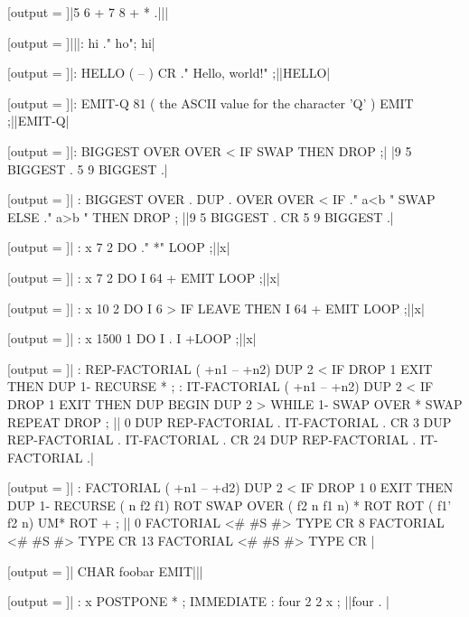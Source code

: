 \RequirePackage{runner}
\newcommand{\result}{}
\makeatletter

[output = \result]|5 6 + 7 8 + * .|||
\typeout{\result}

[output = \result]|||: hi ." ho"; hi|
\typeout{\result}

[output = \result]|: HELLO  ( -- )  CR ." Hello, world!" ;||HELLO|
\typeout{\result}

[output = \result]|: EMIT-Q   81 ( the ASCII value for the character 'Q' ) EMIT ;||EMIT-Q|
\typeout{\result}

[output = \result]|: BIGGEST OVER OVER < IF SWAP THEN DROP ;|%
|9 5 BIGGEST . 5 9 BIGGEST .|
\typeout{\result}

[output = \result]|
  : BIGGEST OVER . DUP .
    OVER OVER < IF
      ." a<b " SWAP
    ELSE
      ." a>b "
    THEN
    DROP ;
||9 5 BIGGEST . CR 5 9 BIGGEST .|
\typeout{\result}

[output = \result]|
  : x 7 2 DO ." *" LOOP ;||x|
\typeout{\result}

[output = \result]|
  : x 7 2 DO I 64 + EMIT LOOP ;||x|
\typeout{\result}

[output = \result]|
  : x 10 2 DO I 6 > IF LEAVE THEN I 64 + EMIT LOOP ;||x|
\typeout{\result}

[output = \result]|
  : x 1500 1 DO I . I +LOOP ;||x|
\typeout{\result}

[output = \result]|
  : REP-FACTORIAL ( +n1 -- +n2)
  DUP 2 < IF DROP 1 EXIT THEN
  DUP 1- RECURSE *
  ;
  : IT-FACTORIAL ( +n1 -- +n2)
  DUP 2 < IF DROP 1 EXIT THEN
  DUP
  BEGIN DUP 2 > WHILE
  1- SWAP OVER * SWAP
  REPEAT DROP
  ;
||
0 DUP REP-FACTORIAL . IT-FACTORIAL . CR
3 DUP REP-FACTORIAL . IT-FACTORIAL . CR
24 DUP REP-FACTORIAL . IT-FACTORIAL .|
\typeout{\result}

[output = \result]|
  : FACTORIAL ( +n1 -- +d2)
  DUP 2 < IF DROP 1 0 EXIT THEN
  DUP 1- RECURSE ( n f2 f1)
  ROT SWAP OVER ( f2 n f1 n)
  * ROT ROT ( f1' f2 n)
  UM* ROT +
  ;
||
0 FACTORIAL <# #S #> TYPE CR
8 FACTORIAL <# #S #> TYPE CR
13 FACTORIAL <# #S #> TYPE CR
|
\typeout{\result}

[output = \result]|
  CHAR foobar EMIT|||
\typeout{\result}

[output = \result]|
  : x POSTPONE * ; IMMEDIATE :
  four 2 2 x ;
||four . |
\typeout{\result}

